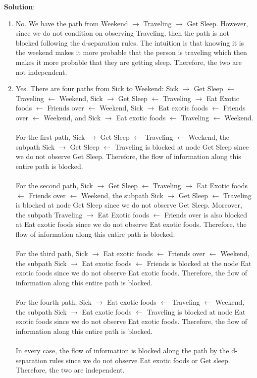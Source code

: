 \documentclass[submit]{../harvardml}
\newenvironment{solution}{
    \vspace{2mm}
    \color{blue}\noindent\textbf{Solution}:
}{}
\begin{document}
\begin{solution}
\begin{enumerate}
    \item No. We have the path from Weekend $\rightarrow$ Traveling $\rightarrow$ Get Sleep. However, since we do not condition on observing Traveling, then the path is not blocked following the d-separation rules. The intuition is that knowing it is the weekend makes it more probable that the person is traveling which then makes it more probable that they are getting sleep. Therefore, the two are not independent. 
    
    \item Yes. There are four paths from Sick to Weekend: Sick $\rightarrow$ Get Sleep $\leftarrow$ Traveling $\leftarrow$ Weekend, Sick $\rightarrow$ Get Sleep $\leftarrow$ Traveling $\rightarrow$ Eat Exotic foods $\leftarrow$ Friends over $\leftarrow$ Weekend, Sick $\rightarrow$ Eat exotic foods $\leftarrow$ Friends over $\leftarrow$ Weekend, and Sick $\rightarrow$ Eat exotic foods $\leftarrow$ Traveling $\leftarrow$ Weekend. 
    \\
    \\
    For the first path, Sick $\rightarrow$ Get Sleep $\leftarrow$ Traveling $\leftarrow$ Weekend, the subpath Sick $\rightarrow$ Get Sleep $\leftarrow$ Traveling is blocked at node Get Sleep since we do not observe Get Sleep. Therefore, the flow of information along this entire path is blocked.
    \\
    \\
    For the second path, Sick $\rightarrow$ Get Sleep $\leftarrow$ Traveling $\rightarrow$ Eat Exotic foods $\leftarrow$ Friends over $\leftarrow$ Weekend, the subpath Sick $\rightarrow$ Get Sleep $\leftarrow$ Traveling is blocked at node Get Sleep since we do not observe Get Sleep. Moreover, the subpath Traveling $\rightarrow$ Eat Exotic foods $\leftarrow$ Friends over is also blocked at Eat exotic foods since we do not observe Eat exotic foods. Therefore, the flow of information along this entire path is blocked.
    \\
    \\
    For the third path, Sick $\rightarrow$ Eat exotic foods $\leftarrow$ Friends over $\leftarrow$ Weekend, the subpath Sick $\rightarrow$ Eat exotic foods $\leftarrow$ Friends is blocked at the node Eat exotic foods since we do not observe Eat exotic foods. Therefore, the flow of information along this entire path is blocked.
    \\
    \\
    For the fourth path, Sick $\rightarrow$ Eat exotic foods $\leftarrow$ Traveling $\leftarrow$ Weekend, the subpath Sick $\rightarrow$ Eat exotic foods $\leftarrow$ Traveling is blocked at node Eat exotic foods since we do not observe Eat exotic foods. Therefore, the flow of information along this entire path is blocked.
    \\
    \\
    In every case, the flow of information is blocked along the path by the d-separation rules since we do not observe Eat exotic foods or Get sleep. Therefore, the two are independent.
    

\end{enumerate}
\end{solution}
\end{document}
